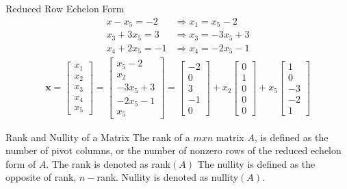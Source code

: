 \begin{example}{Reduced Row Echelon Form}
	\begin{align*}
		x-x_5 =-2   &\Rightarrow x_1=x_5 -2\\
        x_3 + 3x_5 =3 &\Rightarrow x_3=-3x_5+3\\
        x_4 +2x_5 = -1 &\Rightarrow	x_4=-2x_5-1
	\end{align*}
    \begin{align*}
    	\textbf{x}=
        \begin{bmatrix}
       	    x_1\\ x_2 \\ x_3\\ x_4 \\x_5
        \end{bmatrix} =
        \begin{bmatrix}
        	x_5- 2\\ x_2\\ -3x_5 +3\\-2x_5-1\\ x_5 
        \end{bmatrix}=
        \begin{bmatrix}
      	    -2\\ 0 \\ 3 \\-1 \\0
        \end{bmatrix} + x_2
        \begin{bmatrix}
            0 \\ 1 \\ 0 \\ 0 \\ 0 
        \end{bmatrix} + x_5
        \begin{bmatrix}
            1 \\ 0 \\ -3 \\ -2 \\ 1
        \end{bmatrix}
    \end{align*}
\end{example}

\begin{definition}{Rank and Nullity of a Matrix}
The rank of a $m x n$ matrix $A$, is defined as the number of pivot columns, or the number of nonzero rows of the reduced echelon form of $A$. The rank is denoted as rank$(A)$
The nullity is defined as the opposite of rank, $n - $rank. Nullity is denoted as nullity$(A)$.
\cite[47]{LiAl}
\end{definition}

